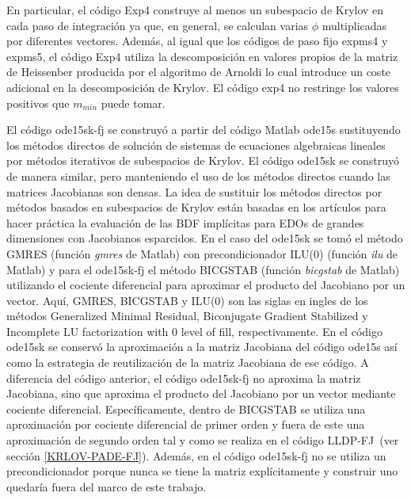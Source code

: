 En particular, el código Exp4 construye al menos un subespacio de Krylov en cada paso de integración ya que, en general, se calculan varias $\phi$ multiplicadas por diferentes vectores. Además, al igual que los códigos de paso fijo expms4 y expms5, el código Exp4 utiliza la descomposición en valores propios de la matriz de Heissenber producida por el algoritmo de Arnoldi lo cual introduce un coste adicional en la descomposición de Krylov. El código exp4 no restringe los valores positivos que $m_{min}$ puede tomar.

El código ode15sk-fj se construyó a partir del c\'odigo Matlab ode15s sustituyendo los m\'etodos directos de soluci\'on
de sistemas de ecuaciones algebraicas lineales por m\'etodos iterativos de subespacios de Krylov. El código ode15sk se construyó de manera similar, pero manteniendo el uso de los m\'etodos directos cuando las matrices Jacobianas son densas. La idea de sustituir los m\'etodos directos por m\'etodos basados en subespacios de Krylov est\'an basadas en los art\'iculos \cite{shampinepde,zou2016} para hacer pr\'actica la evaluaci\'on de las BDF impl\'icitas para EDOs de grandes dimensiones con Jacobianos esparcidos.
En el caso del ode15sk se tom\'o el m\'etodo GMRES (función \emph{gmres} de Matlab) con precondicionador ILU(0) (función \emph{ilu} de Matlab) y para el ode15sk-fj el m\'etodo BICGSTAB (función \emph{bicgstab} de Matlab) utilizando el cociente diferencial para aproximar el producto del Jacobiano por un vector. Aquí, GMRES, BICGSTAB y ILU(0) son las siglas en ingles de los métodos  Generalized Minimal Residual, Biconjugate Gradient Stabilized y Incomplete LU factorization with 0 level of fill, respectivamente. En el código ode15sk se conserv\'o la aproximación a la matriz Jacobiana del código ode15s así como la  estrategia de reutilizaci\'on de la matriz Jacobiana de ese código. A diferencia del código anterior, el c\'odigo ode15sk-fj no aproxima la matriz Jacobiana, sino que aproxima el producto del Jacobiano por un vector mediante cociente diferencial. Específicamente, dentro de BICGSTAB se utiliza una aproximaci\'on por cociente diferencial de primer orden y fuera de este una aproximaci\'on de segundo orden tal y como se realiza en el c\'odigo LLDP-FJ~(ver secci\'on \ref{KRLOV-PADE-FJ}). Adem\'as, en el código ode15sk-fj no se utiliza un precondicionador porque nunca se tiene la matriz explícitamente y construir uno quedaría fuera del marco de este trabajo. 

